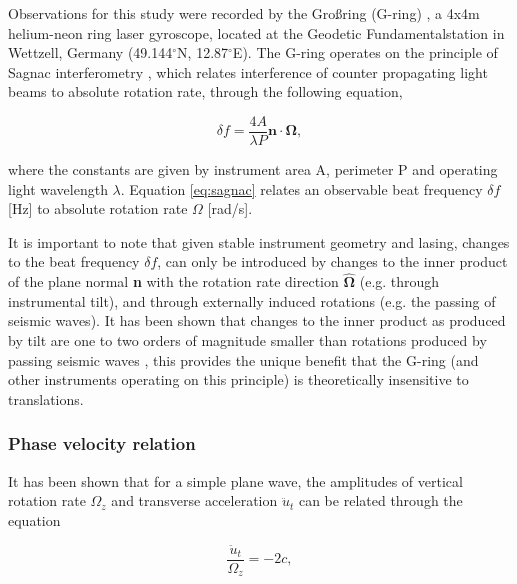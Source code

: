 \documentclass{gji}
\begin{document}
Observations for this study were recorded by the Gro\ss ring (G-ring) \cite{schreiber2006ring} , a 4x4m helium-neon ring laser gyroscope, located at the Geodetic Fundamentalstation in Wettzell, Germany (49.144$^\circ$N, 12.87$^\circ$E). The G-ring operates on the principle of Sagnac interferometry \cite{stedman1997ring}, which relates interference of counter propagating light beams to absolute rotation rate, through the following equation, 

\begin{equation}\label{eq:sagnac}
	\delta f = \frac{4A}{\lambda P}\mathbf{n}\cdot \mathbf{\Omega},
\end{equation}

\noindent where the constants are given by instrument area A, perimeter P and operating light wavelength $\lambda$. Equation \ref{eq:sagnac} relates an observable beat frequency $\delta f$ [Hz] to absolute rotation rate $\Omega$ [rad/s].

It is important to note that given stable instrument geometry and lasing, changes to the beat frequency $\delta f$, can only be introduced by changes to the inner product of the plane normal {\bfseries n} with the rotation rate direction $\mathbf{\hat{\Omega}}$ (e.g. through instrumental tilt), and through externally induced rotations (e.g. the passing of seismic waves). It has been shown that changes to the inner product as produced by tilt are one to two orders of magnitude smaller than rotations produced by passing seismic waves \cite{mcleod1998comparison} \cite{schreiber2006ring} , this provides the unique benefit that the G-ring (and other instruments operating on this principle) is theoretically insensitive to translations.

\subsubsection{Phase velocity relation}\label{phasevel}
It has been shown that for a simple plane wave, the amplitudes of vertical rotation rate $\Omega_z$  and transverse acceleration $\ddot{u}_t$ can be related through the equation 

\begin{equation}\label{eq:phasevelocity}
	\frac{\ddot{u}_t}{\Omega_z} = -2c,
\end{equation}
\end{document}
